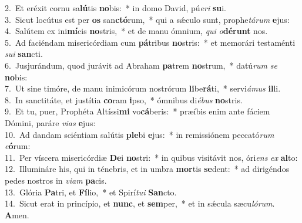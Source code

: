 {2.~}Et eréxit cornu sa\textbf{lú}tis \textbf{no}bis:~* in domo David, pú\textit{e}\textit{ri} \textbf{su}i.\\
{3.~}Sicut locútus est per \textbf{os} san\textbf{ctó}rum,~* qui a sǽculo sunt, prophe\textit{tá}\textit{rum} \textbf{e}jus:\\
{4.~}Salútem ex ini\textbf{mí}cis \textbf{no}stris,~* et de manu ómnium, \textit{qui} \textit{o}\textbf{dé}\textbf{runt} nos.\\
{5.~}Ad faciéndam misericórdiam cum \textbf{pá}tribus \textbf{no}stris:~* et memorári testaménti \textit{su}\textit{i} \textbf{san}cti.\\
{6.~}Jusjurándum, quod jurávit ad Abraham \textbf{pa}trem \textbf{no}strum,~* datú\textit{rum} \textit{se} \textbf{no}bis:\\
{7.~}Ut sine timóre, de manu inimicórum nostrórum \textbf{li}be\textbf{rá}ti,~* servi\textit{á}\textit{mus} \textbf{il}li.\\
{8.~}In sanctitáte, et justítia \textbf{co}ram \textbf{i}pso,~* ómnibus di\textit{é}\textit{bus} \textbf{no}stris.\\
{9.~}Et tu, puer, Prophéta Altíssi\textbf{mi} vo\textbf{cá}beris:~* præíbis enim ante fáciem Dómini, paráre \textit{vi}\textit{as} \textbf{e}jus:\\
{10.~}Ad dandam sciéntiam salútis \textbf{ple}bi \textbf{e}jus:~* in remissiónem peccató\textit{rum} \textit{e}\textbf{ó}rum:\\
{11.~}Per víscera misericórdiæ \textbf{De}i \textbf{no}stri:~* in quibus visitávit nos, óri\textit{ens} \textit{ex} \textbf{al}to:\\
{12.~}Illumináre his, qui in ténebris, et in umbra \textbf{mor}tis \textbf{se}dent:~* ad dirigéndos pedes nostros in \textit{vi}\textit{am} \textbf{pa}cis.\\
{13.~}Glória \textbf{Pa}tri, et \textbf{Fí}lio,~* et Spirí\textit{tu}\textit{i} \textbf{San}cto.\\
{14.~}Sicut erat in princípio, et \textbf{nunc}, et \textbf{sem}per,~* et in sǽcula sæcu\textit{ló}\textit{rum}. \textbf{A}men.\\
